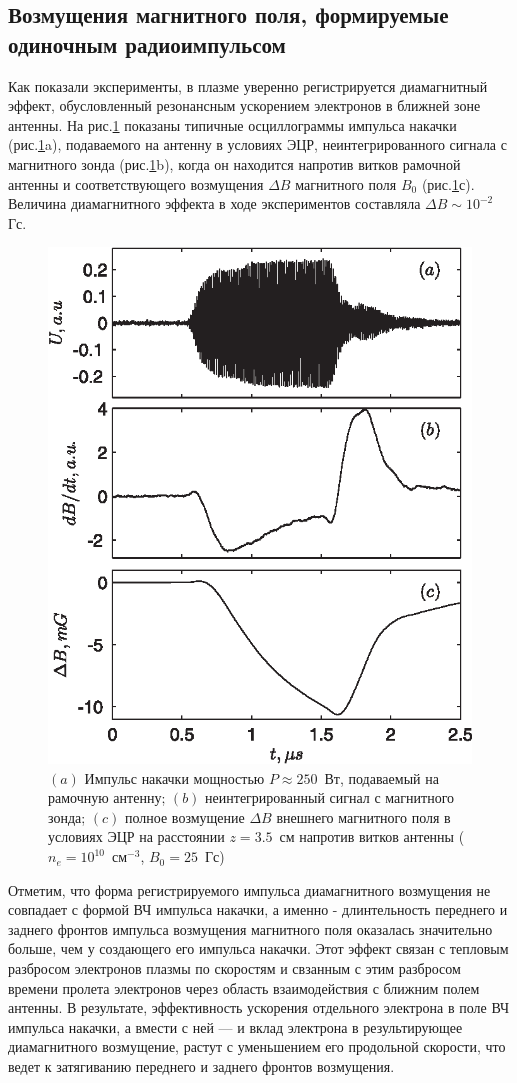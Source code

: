 \documentclass[autoref,10pt]{disser}
\begin{document}
\subsection{Возмущения магнитного поля, формируемые одиночным радиоимпульсом}
Как показали эксперименты, в плазме уверенно регистрируется диамагнитный эффект, обусловленный резонансным ускорением электронов в ближней зоне антенны. На \mbox{рис.\ref{fig:pump}} показаны типичные осциллограммы импульса накачки (\mbox{рис.\ref{fig:pump}}a), подаваемого на антенну в условиях ЭЦР, неинтегрированного сигнала с магнитного зонда (\mbox{рис.\ref{fig:pump}}b),  когда он находится напротив витков рамочной антенны  и соответствующего возмущения $\Delta{}B$ магнитного поля $B_{0}$ (\mbox{рис.\ref{fig:pump}}с). Величина диамагнитного эффекта в ходе экспериментов составляла $\Delta{}B\sim{}10^{-2}$\,Гс.

\begin{figure}[H]
\centering
    \includegraphics*[width=0.6\columnwidth]{pics/pulse_demo.eps}
    \caption{$(a)$ Импульс накачки мощностью $P\approx{}250$~Вт, подаваемый на рамочную антенну; $(b)$ неинтегрированный сигнал с магнитного зонда; $(c)$ полное возмущение $\Delta{}B$ внешнего магнитного поля в условиях ЭЦР на расстоянии $z=3.5$~см напротив витков антенны ($n_{e}=10^{10}$~см$^{-3}$, $B_{0} = 25$~Гс)}
    \label{fig:pump}
\end{figure}

Отметим, что форма регистрируемого импульса диамагнитного возмущения не совпадает с формой ВЧ импульса накачки, а именно - длинтельность переднего и заднего фронтов импульса возмущения магнитного поля  оказалась значительно больше, чем у создающего его импульса накачки.  Этот эффект связан с тепловым разбросом электронов плазмы по скоростям и свзанным с этим разбросом времени пролета электронов через область взаимодействия с ближним полем антенны. В результате, эффективность ускорения отдельного электрона в поле ВЧ импульса накачки, а вмести с ней --- и вклад электрона в результирующее диамагнитного возмущение, растут с уменьшением его продольной скорости, что ведет к затягиванию переднего и заднего фронтов возмущения. 
\end{document}
